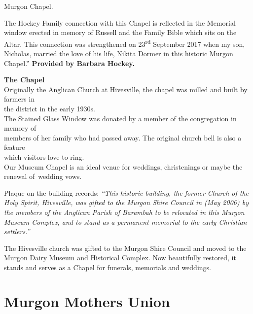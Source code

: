 Murgon Chapel.



The Hockey Family connection with this Chapel is reflected in the Memorial window erected in memory of Russell and the Family Bible which sits on the Altar. This connection was strengthened on 23\textsuperscript{rd} September 2017 when my son, Nicholas, married the love of his life, Nikita Dormer in this historic Murgon Chapel.'' \textbf{Provided by Barbara Hockey.}





\textbf{The Chapel}\\

Originally the Anglican Church at Hivesville, the chapel was milled and built by farmers in\\

the district in the early 1930s.\\

The Stained Glass Window was donated by a member of the congregation in memory of\\

members of her family who had passed away. The original church bell is also a feature\\

which visitors love to ring.\\

Our Museum Chapel is an ideal venue for weddings, christenings or maybe the renewal of~wedding vows.



Plaque on the building records: \emph{``This historic building, the former Church of the Holy Spirit, Hivesville, was gifted to the Murgon Shire Council in (May 2006) by the members of the Anglican Parish of Barambah to be relocated in this Murgon Museum Complex, and to stand as a permanent memorial to the early Christian settlers.''}





The Hivesville church was gifted to the Murgon Shire Council and moved to the Murgon Dairy Museum and Historical Complex. Now beautifully restored, it stands and serves as a Chapel for funerals, memorials and weddings.



\section{Murgon Mothers Union}



